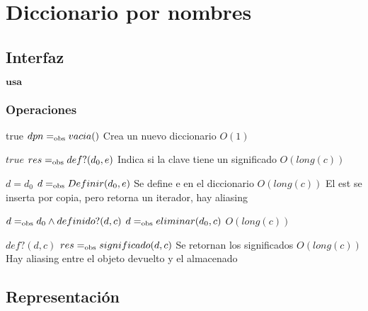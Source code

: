 
\section{Diccionario por nombres}

\subsection{Interfaz}

$\textbf{usa}$  


\subsubsection*{Operaciones}


 {true}
 {$dpn =_{\mathrm{obs}} vacia()$}
 {Crea un nuevo diccionario}
 {}
 {$O(1)$}
 
  {$true$}
  {$res =_{\mathrm{obs}} def?(d_0,e)$}
  {Indica si la clave tiene un significado}
  {}
  {$O(long(c))$}

  {$d=d_0$}
  {$d =_{\mathrm{obs}} Definir(d_0,e)$}
  {Se define e en el diccionario}
  {$O(long(c))$}
  {El est se inserta por copia, pero retorna un iterador, hay aliasing}

 {$d =_{\mathrm{obs}} d_0 \land definido?(d,c)$}
 {$d =_{\mathrm{obs}} eliminar(d_0,c)$}
 {}
 {$O(long(c))$}
 {}

 {$def?(d,c)$}
 {$res =_{\mathrm{obs}} significado(d,c)$}
 {Se retornan los significados}
 {$O(long(c))$}
 {Hay aliasing entre el objeto devuelto y el almacenado}


\subsection{Representación}

